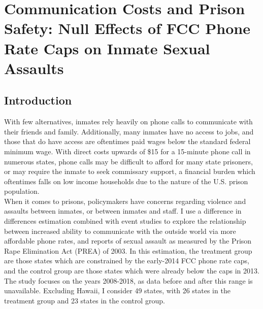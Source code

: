 \chapter[Chapter 2]{Communication Costs and Prison Safety: Null Effects of FCC Phone Rate Caps on Inmate Sexual Assaults}

\graphicspath{{C:/Users/david/coding/01_PRISON_PHONE_paper/6000_LaTeX/}}

\section{Introduction}
With few alternatives, inmates rely heavily on phone calls to communicate with their friends and family. Additionally, many inmates have no access to jobs, and those that do have access are oftentimes paid wages below the standard federal minimum wage. With direct costs upwards of \$15 for a 15-minute phone call in numerous states, phone calls may be difficult to afford for many state prisoners, or may require the inmate to seek commissary support, a financial burden which oftentimes falls on low income households due to the nature of the U.S. prison population. \\

When it comes to prisons, policymakers have concerns regarding violence and assaults between inmates, or between inmates and staff. I use a difference in differences estimation combined with event studies to explore the relationship between increased ability to communicate with the outside world via more affordable phone rates, and reports of sexual assault as measured by the Prison Rape Elimination Act (PREA) of 2003. In this estimation, the treatment group are those states which are constrained by the early-2014 FCC phone rate caps, and the control group are those states which were already below the caps in 2013. The study focuses on the years 2008-2018, as data before and after this range is unavailable. Excluding Hawaii, I consider 49 states, with 26 states in the treatment group and 23 states in the control group. \\ 

